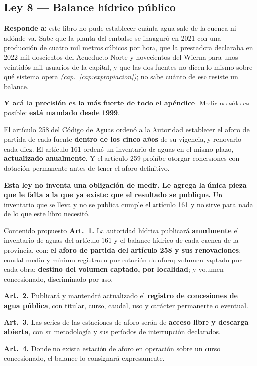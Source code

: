 \subsection{Ley 8 --- Balance hídrico público}

\textbf{Responde a:} este libro no pudo establecer cuánta agua sale de la cuenca ni adónde
va. Sabe que la planta del embalse se inauguró en 2021 con una producción de cuatro mil metros cúbicos por hora, que la prestadora declaraba en 2022 mil doscientos del Acueducto Norte y novecientos del Wierna para unos veintidós mil usuarios de la capital, y que las dos fuentes no dicen lo mismo sobre qué sistema opera \textit{(cap.\ \ref{cap:expropiacion})}; no sabe cuánto de eso resiste un balance.

\begin{cautela}
\textbf{Y acá la precisión es la más fuerte de todo el apéndice.} Medir no sólo es posible:
\textbf{está mandado desde 1999}.

El artículo 258 del Código de Aguas ordenó a la Autoridad establecer el aforo de partida de cada
fuente \textbf{dentro de los cinco años} de su vigencia, y renovarlo cada diez. El artículo 161
ordenó un inventario de aguas en el mismo plazo, \textbf{actualizado anualmente}. Y el artículo
259 prohíbe otorgar concesiones con dotación permanente antes de tener el aforo definitivo.

\textbf{Esta ley no inventa una obligación de medir. Le agrega la única pieza que le falta a la
que ya existe: que el resultado se publique.} Un inventario que se lleva y no se publica cumple
el artículo 161 y no sirve para nada de lo que este libro necesitó.
\end{cautela}

\begin{ficha}{Contenido propuesto}
\textbf{Art.\ 1.} La autoridad hídrica publicará \textbf{anualmente} el inventario de aguas
del artículo 161 y el balance hídrico de cada cuenca de la provincia, con: \textbf{el aforo de
partida del artículo 258 y sus renovaciones}; caudal medio y mínimo registrado por estación de
aforo;
volumen captado por cada obra; \textbf{destino del volumen captado, por localidad}; y volumen
concesionado, discriminado por uso.

\textbf{Art.\ 2.} Publicará y mantendrá actualizado el \textbf{registro de concesiones de agua
pública}, con titular, curso, caudal, uso y carácter permanente o eventual.

\textbf{Art.\ 3.} Las series de las estaciones de aforo serán de \textbf{acceso libre y
descarga abierta}, con su metodología y sus períodos de interrupción declarados.

\textbf{Art.\ 4.} Donde no exista estación de aforo en operación sobre un curso concesionado,
el balance lo consignará expresamente.
\end{ficha}

